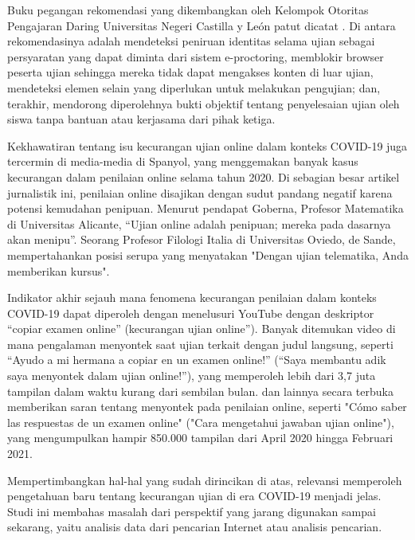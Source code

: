 Buku pegangan rekomendasi yang dikembangkan oleh Kelompok Otoritas Pengajaran Daring Universitas Negeri Castilla y León patut dicatat \citep{garciaevaluacion}. Di antara rekomendasinya adalah mendeteksi peniruan identitas selama ujian sebagai persyaratan yang dapat diminta dari sistem e-proctoring, memblokir browser peserta ujian sehingga mereka tidak dapat mengakses konten di luar ujian, mendeteksi elemen selain yang diperlukan untuk melakukan pengujian; dan, terakhir, mendorong diperolehnya bukti objektif tentang penyelesaian ujian oleh siswa tanpa bantuan atau kerjasama dari pihak ketiga.

Kekhawatiran tentang isu kecurangan ujian online dalam konteks COVID-19 juga tercermin di media-media di Spanyol, yang menggemakan banyak kasus kecurangan dalam penilaian online selama tahun 2020. Di sebagian besar artikel jurnalistik ini, penilaian online disajikan dengan sudut pandang negatif karena potensi kemudahan penipuan. Menurut pendapat Goberna, Profesor Matematika di Universitas Alicante, “Ujian online adalah penipuan; mereka pada dasarnya akan menipu”. Seorang Profesor Filologi Italia di Universitas Oviedo, de Sande, mempertahankan posisi serupa yang menyatakan "Dengan ujian telematika, Anda memberikan kursus".

Indikator akhir sejauh mana fenomena kecurangan penilaian dalam konteks COVID-19 dapat diperoleh dengan menelusuri YouTube dengan deskriptor “copiar examen online” (kecurangan ujian online”). Banyak ditemukan video di mana pengalaman menyontek saat ujian terkait dengan judul langsung, seperti “Ayudo a mi hermana a copiar en un examen online!” (“Saya membantu adik saya menyontek dalam ujian online!”), yang memperoleh lebih dari 3,7 juta tampilan dalam waktu kurang dari sembilan bulan. dan lainnya secara terbuka memberikan saran tentang menyontek pada penilaian online, seperti "Cómo saber las respuestas de un examen online" ("Cara mengetahui jawaban ujian online"), yang mengumpulkan hampir 850.000 tampilan dari April 2020 hingga Februari 2021.

Mempertimbangkan hal-hal yang sudah dirincikan di atas, relevansi memperoleh pengetahuan baru tentang kecurangan ujian di era COVID-19 menjadi jelas. Studi ini membahas masalah dari perspektif yang jarang digunakan sampai sekarang, yaitu analisis data dari pencarian Internet atau analisis pencarian.